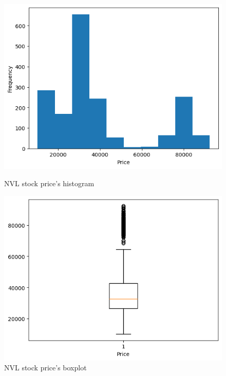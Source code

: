 \documentclass[conference]{IEEEtran}
\begin{document}
\begin{figure}[H]
    \centering
    \begin{minipage}{0.23\textwidth}
    \centering
    \includegraphics[width=1\textwidth]{figures/descriptive_stat/NVL_Histogram.png}
    \caption{NVL stock price's histogram}
    \label{fig_NVL_histogram}
    \end{minipage}
    \hfill
    \begin{minipage}{0.23\textwidth}
    \centering
    \includegraphics[width=1\textwidth]{figures/descriptive_stat/NVL_BoxPlot.png}
    \caption{NVL stock price's boxplot}
    \label{fig_NVL_bp}
    \end{minipage}
\end{figure}
\end{document}
